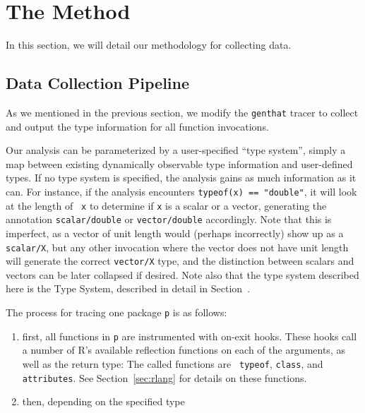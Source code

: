 \documentclass[acmsmall,10pt,review,anonymous]{acmart}\settopmatter{printfolios=true,printccs=false,printacmref=false}
\begin{document}


\section{The Method}

In this section, we will detail our methodology for collecting data.

%
\subsection{Data Collection Pipeline}

As we mentioned in the previous section, we modify the {\tt genthat} tracer
to collect and output the type information for all function invocations.

 Our analysis can be parameterized by a user-specified ``type
system'', simply a map between existing dynamically observable type
information and user-defined types.  If no type system is specified, the
analysis gains as much information as it can.  For instance, if the analysis
encounters {\tt typeof(x) == "double"}, it will look at the length of {\tt
  x} to determine if {\tt x} is a scalar or a vector, generating the
annotation {\tt scalar/double} or {\tt vector/double} accordingly.  Note
that this is imperfect, as a vector of unit length would (perhaps
incorrectly) show up as a {\tt scalar/X}, but any other invocation where the
vector does not have unit length will generate the correct {\tt vector/X}
type, and the distinction between scalars and vectors can be later collapsed
if desired.  Note also that the type system described here is the
 Type System, described in detail in Section~.

The process for tracing one package {\tt p} is as follows:

\begin{enumerate}
\item first, all functions in {\tt p} are instrumented with on-exit hooks.
  These hooks call a number of R's available reflection functions on each of
  the arguments, as well as the return type: The called functions are {\tt
    typeof}, {\tt class}, and {\tt attributes}.  See Section~\ref{sec:rlang}
  for details on these functions.
	
\item then, depending on the specified type 
\end{enumerate}
\end{document}
